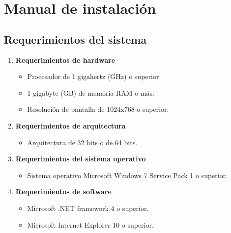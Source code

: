 \appendix
\clearpage
\addappheadtotoc
\appendixpage

\chapter{Manual de instalaci\'{o}n}
\thispagestyle{fancy}
\section*{Requerimientos del sistema}

\begin{enumerate}
	\item \textbf{Requerimientos de hardware}
	
	\begin{itemize}
		\item Procesador de 1 gigahertz (GHz) o superior.
		
		\item 1 gigabyte (GB) de memoria RAM o m\'{a}s.
		
		\item Resoluci\'{o}n de pantalla de 1024x768 o superior.
	\end{itemize}
	
	\item \textbf{Requerimientos de arquitectura}
	
	\begin{itemize}
		\item Arquitectura de 32 bits o de 64 bits.
	\end{itemize}
	
	\item \textbf{Requerimientos del sistema operativo}
	
	\begin{itemize}
		\item Sistema operativo Microsoft Windows 7 Service Pack 1 o superior.
	\end{itemize}
	
	\item \textbf{Requerimientos de software}
	
	\begin{itemize}
		\item Microsoft .NET framework 4 o superior.
		
		\item Microsoft Internet Explorer 10 o superior.
	\end{itemize}
	
\end{enumerate}

